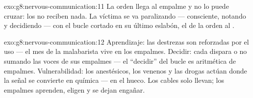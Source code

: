 \begin{solution}{exo:g8:nervous-communication:11}
La orden llega al empalme y no lo puede cruzar: los  no reciben
nada. La víctima se va paralizando --- consciente, notando y decidiendo
--- con el bucle cortado en su último eslabón, el de la orden al
.
\end{solution}

\begin{solution}{exo:g8:nervous-communication:12}
Aprendizaje: las destrezas son  reforzadas por el uso --- el
mes de la malabarista vive en los empalmes. Decidir: cada 
dispara o no sumando las voces de sus empalmes --- el ``decidir'' del
bucle es aritmética de empalmes. Vulnerabilidad: los anestésicos, los
venenos y las drogas actúan donde la señal se convierte en química ---
en el hueco. Los cables solo llevan; los empalmes aprenden, eligen y se
dejan engañar.
\end{solution}

